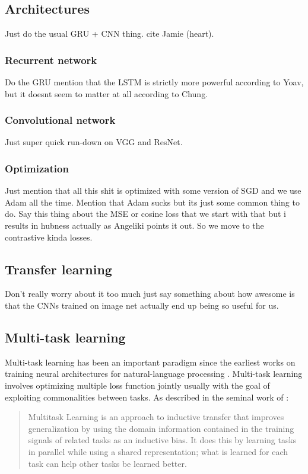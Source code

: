 \subsection{Architectures}
Just do the usual GRU + CNN thing. cite Jamie (heart).

\subsubsection{Recurrent network}
Do the GRU mention that the LSTM is strictly more powerful according to Yoav, but it doesnt seem to matter at all according to Chung. 

\subsubsection{Convolutional network}
Just super quick run-down on VGG and ResNet.

\subsubsection{Optimization}
Just mention that all this shit is optimized with some version of SGD and we use Adam all the time. Mention that Adam sucks but its just some common thing to do. Say this thing about the MSE or cosine loss that we start with that but i results in hubness actually as Angeliki points it out. So we move to the contrastive kinda losses.

\subsection{Transfer learning}
Don't really worry about it too much just say something about how awesome is that the CNNs trained on image net actually end up being so useful for us. 

\subsection{Multi-task learning}
Multi-task learning has been an important paradigm since the earliest works on training neural architectures for natural-language processing \cite{collobert2008unified}. Multi-task learning involves optimizing multiple loss function jointly usually with the goal of exploiting commonalities between tasks. As described in the seminal work of \cite{caruana1997multitask}:

\begin{quote}
Multitask Learning is an approach to inductive transfer that improves generalization by using the domain information contained in the training signals of related tasks as an inductive bias. It does this by learning tasks in parallel while using a shared representation; what is learned for each task can help other tasks be learned better.
\end{quote}

